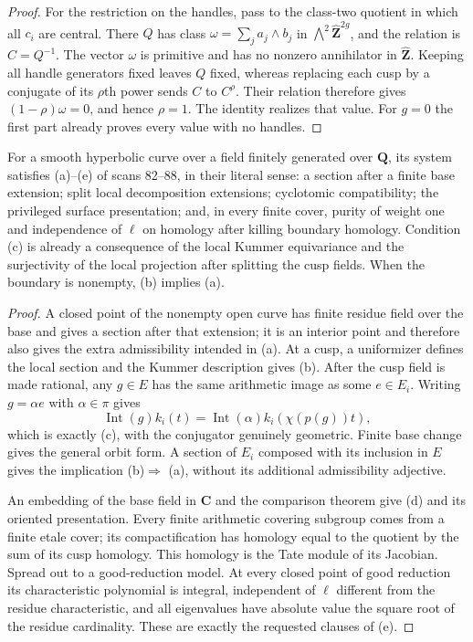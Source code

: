 \begin{proof}
For the restriction on the handles, pass to the
class-two quotient in which all $c_i$ are central.
There $Q$ has class
$\omega=\sum_j a_j\wedge b_j$ in
$\bigwedge^2\widehat{\mathbf Z}^{2g}$, and the
relation is $C=Q^{-1}$.  The vector $\omega$ is
primitive and has no nonzero annihilator in
$\widehat{\mathbf Z}$.  Keeping all handle generators
fixed leaves $Q$ fixed, whereas replacing each cusp
by a conjugate of its $\rho$th power sends $C$ to
$C^\rho$.  Their relation therefore gives
$(1-\rho)\omega=0$, and hence $\rho=1$.
The identity realizes that value.  For $g=0$ the first
part already proves every value with no handles.
\end{proof}

\begin{proposition}
\label{A:five-conditions}
For a smooth hyperbolic curve over a field finitely
generated over $\mathbf Q$, its system satisfies
(a)--(e) of scans 82--88, in their literal sense:
a section after a finite base extension; split local
decomposition extensions; cyclotomic compatibility;
the privileged surface presentation; and, in every
finite cover, purity of weight one and independence
of $\ell$ on homology after killing boundary homology.
Condition (c) is already a consequence of the local
Kummer equivariance and the surjectivity of the local
projection after splitting the cusp fields.  When the
boundary is nonempty, (b) implies (a).
\end{proposition}
\begin{proof}
A closed point of the nonempty open curve has finite
residue field over the base and gives a section after
that extension; it is an interior point and therefore
also gives the extra admissibility intended in (a).
At a cusp, a uniformizer defines the local section
and the Kummer description gives (b).  After the cusp
field is made rational, any $g\in E$ has the same
arithmetic image as some $e\in E_i$.  Writing
$g=\alpha e$ with $\alpha\in\pi$ gives
\[
 \operatorname{Int}(g)k_i(t)=
       \operatorname{Int}(\alpha)k_i(\chi(p(g))t),
\]
which is exactly (c), with the conjugator genuinely
geometric.  Finite base change gives the general
orbit form.  A section of $E_i$ composed with its
inclusion in $E$ gives the implication (b)$\Rightarrow$
(a), without its additional admissibility adjective.

An embedding of the base field in $\mathbf C$ and
the comparison theorem give (d) and its oriented
presentation.  Every finite arithmetic covering
subgroup comes from a finite etale cover; its
compactification has homology equal to the quotient
by the sum of its cusp homology.  This homology is
the Tate module of its Jacobian.  Spread out to a
good-reduction model.  At every closed point of good
reduction its characteristic polynomial is integral,
independent of $\ell$ different from the residue
characteristic, and all eigenvalues have absolute
value the square root of the residue cardinality.
These are exactly the requested clauses of (e).
\end{proof}

